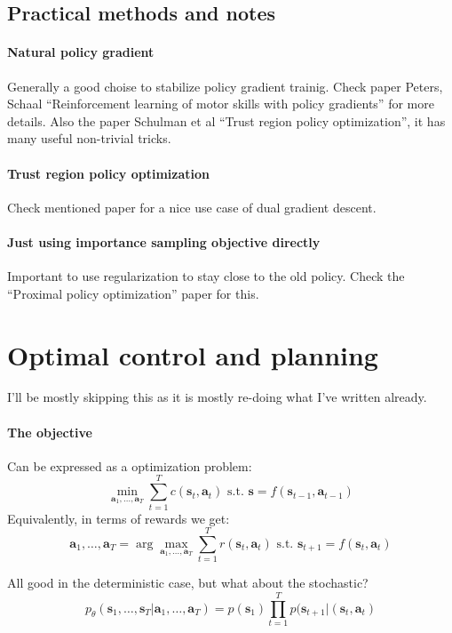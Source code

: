 \documentclass{report}
\newcommand{\argmax}{\arg\!\max}
\begin{document}
\section{Practical methods and notes}
\subsubsection{Natural policy gradient}
Generally a good choise to stabilize policy gradient trainig.
Check paper Peters, Schaal ``Reinforcement learning of motor skills with policy gradients'' for more details.
Also the paper Schulman et al ``Trust region policy optimization'',
it has many useful non-trivial tricks.
\subsubsection{Trust region policy optimization}
Check mentioned paper for a nice use case of dual gradient descent.
\subsubsection{Just using importance sampling objective directly}
Important to use regularization to stay close to the old policy.
Check the ``Proximal policy optimization'' paper for this.




\chapter{Optimal control and planning}
I'll be mostly skipping this as it is mostly re-doing what I've written already.

\subsubsection{The objective}
Can be expressed as a optimization problem:
\begin{equation}
		\min_{\bm{a}_1, \dots, \bm{a}_T} \sum_{t=1}^{T} c(\bm{s}_{t}, \bm{a}_{t}) \text{ s.t. } \bm{s} = f (\bm{s}_{t-1}, \bm{a}_{t-1} ) 
\end{equation}
Equivalently, in terms of rewards we get:
\begin{equation}
		\bm{a}_1, \dots, \bm{a}_T = \argmax_{\bm{a}_1, \dots, \bm{a}_T} \sum_{t=1}^{T} r (\bm{s}_{t}, \bm{a}_{t} ) 
		\text{ s.t. } \bm{s}_{t+1} = f (\bm{s}_{t}, \bm{a}_{t} )
\end{equation}

All good in the deterministic case, but what about the stochastic?
\begin{equation}
p_\theta \left( \bm{s}_1, \dots, \bm{s}_T |  \bm{a}_1, \dots, \bm{a}_T \right) 
= p(\bm{s}_1) \prod_{t=1}^{T} p(\bm{s}_{t+1}| (\bm{s}_{t}, \bm{a}_{t} ) 
\end{equation}
\end{document}
